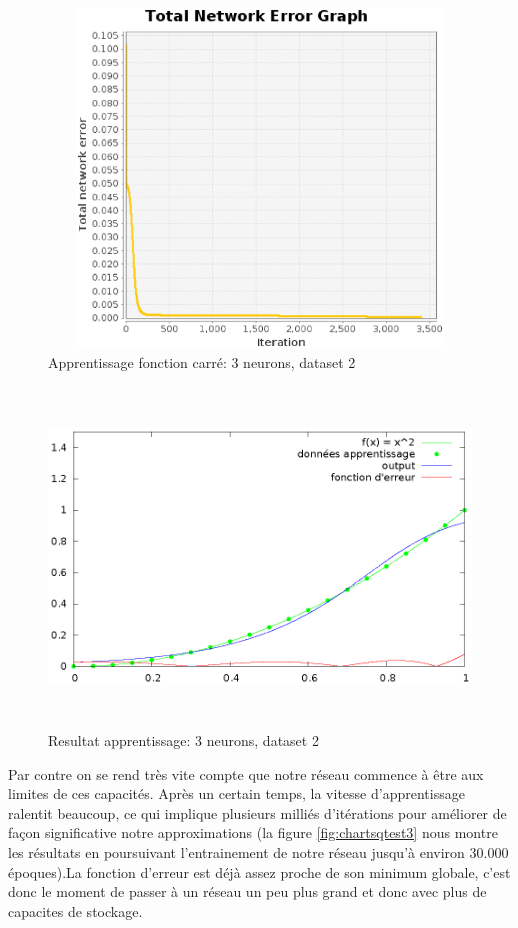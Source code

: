 \documentclass[twoside,openright,a4paper,11pt,french]{article}
\begin{document}
\begin{figure}[h]
\centering
\includegraphics[width=12cm,height=9cm]{./pics/sqtest2.eps}
\caption{Apprentissage fonction carré: 3 neurons, dataset 2}
\label{fig:sqtest2}
\end{figure}

\begin{figure}[h]
\centering
\includegraphics[width=12cm,height=9cm]{./pics/chartsqtest2.eps}
\caption{Resultat apprentissage: 3 neurons, dataset 2}
\label{fig:chartsqtest2}
\end{figure}

Par contre on se rend très vite compte que notre réseau commence à être aux limites
de ces capacités.
Après un certain temps, la vitesse d'apprentissage ralentit beaucoup, 
ce qui implique plusieurs milliés d'itérations pour améliorer de façon 
significative notre approximations (la figure \ref{fig:chartsqtest3} nous
montre les résultats en poursuivant l'entrainement de notre réseau jusqu'à
environ 30.000 époques).La fonction d'erreur est déjà assez proche de son minimum 
globale, c'est donc le moment de passer à un réseau un peu plus grand
et donc avec plus de capacites de stockage.
\end{document}
